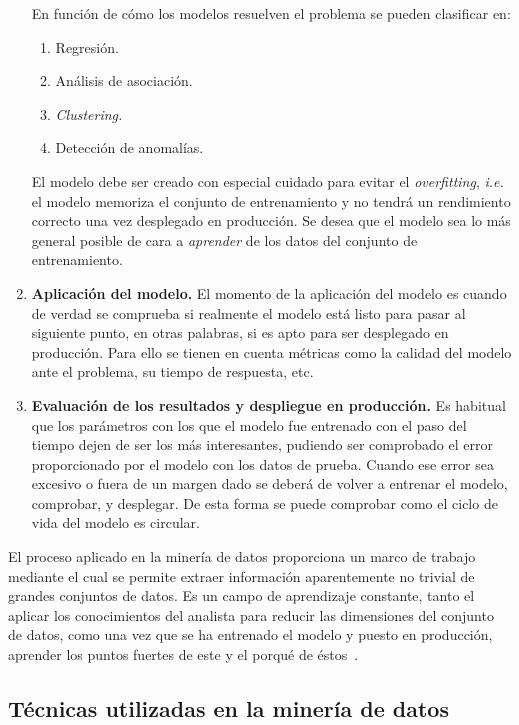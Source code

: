 \begin{enumerate}
En función de cómo los modelos resuelven el problema se pueden clasificar en:
    \begin{enumerate}
        \item Regresión.
        \item Análisis de asociación.
        \item \textit{Clustering.}
        \item Detección de anomalías.
    \end{enumerate}
    
    El modelo debe ser creado con especial cuidado para evitar el \textit{overfitting}, \textit{i.e.} el modelo memoriza el conjunto de entrenamiento y no tendrá un rendimiento correcto una vez desplegado en producción. Se desea que el modelo sea lo más general posible de cara a \textit{aprender} de los datos del conjunto de entrenamiento.

    \item \textbf{Aplicación del modelo.}
	El momento de la aplicación del modelo es cuando de verdad se comprueba si realmente el modelo está listo para pasar al siguiente punto, en otras palabras, si es apto para ser desplegado en producción. 
	Para ello se tienen en cuenta métricas como la calidad del modelo ante el problema, su tiempo de respuesta, etc.
    
	\item \textbf{Evaluación de los resultados y despliegue en producción.}
	Es habitual que los parámetros con los que el modelo fue entrenado con el paso del tiempo dejen de ser los más interesantes, pudiendo ser comprobado el error proporcionado por el modelo con los datos de prueba. Cuando ese error sea excesivo o fuera de un margen dado se deberá de volver a entrenar el modelo, comprobar, y desplegar. 
	De esta forma se puede comprobar como el ciclo de vida del modelo es circular.
\end{enumerate}

El proceso aplicado en la minería de datos proporciona un marco de trabajo mediante el cual se permite extraer información aparentemente no trivial de grandes conjuntos de datos. 
Es un campo de aprendizaje constante, tanto el aplicar los conocimientos del analista para reducir las dimensiones del conjunto de datos, como una vez que se ha entrenado el modelo y puesto en producción, aprender los puntos fuertes de este y el porqué de éstos~\cite{Chapman2000CRISPDM1S}.

\subsection{Técnicas utilizadas en la minería de datos}

